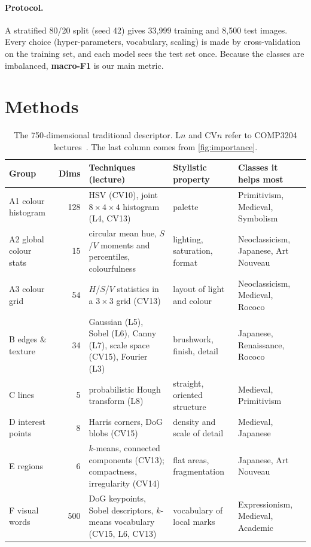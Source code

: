 \documentclass[10pt,twocolumn,a4paper]{article}
\begin{document}
\paragraph{Protocol.}
A stratified 80/20 split (seed 42) gives 33{,}999 training and 8{,}500 test images. Every choice (hyper-parameters, vocabulary, scaling) is made by cross-validation on the training set, and each model sees the test set once. Because the classes are imbalanced, \textbf{macro-F1} is our main metric.

\section{Methods}
\label{sec:methods}

\begin{table}[t]
\centering
\small
\begin{tabular}{@{}l r l l l@{}}
\toprule
Group & Dims & Techniques (lecture) & Stylistic property & Classes it helps most \\
\midrule
A1 colour histogram & 128 & HSV (CV10), joint $8{\times}4{\times}4$ histogram (L4, CV13) & palette & Primitivism, Medieval, Symbolism \\
A2 global colour stats & 15 & circular mean hue, $S$/$V$ moments and percentiles, colourfulness~\cite{hasler2003measuring} & lighting, saturation, format & Neoclassicism, Japanese, Art Nouveau \\
A3 colour grid & 54 & $H$/$S$/$V$ statistics in a $3{\times}3$ grid (CV13) & layout of light and colour & Neoclassicism, Medieval, Rococo \\
B edges \& texture & 34 & Gaussian (L5), Sobel (L6), Canny (L7), scale space (CV15), Fourier (L3) & brushwork, finish, detail & Japanese, Renaissance, Rococo \\
C lines & 5 & probabilistic Hough transform (L8) & straight, oriented structure & Medieval, Primitivism \\
D interest points & 8 & Harris corners, DoG blobs (CV15) & density and scale of detail & Medieval, Japanese \\
E regions & 6 & $k$-means, connected components (CV13); compactness, irregularity (CV14) & flat areas, fragmentation & Japanese, Art Nouveau \\
F visual words & 500 & DoG keypoints, Sobel descriptors, $k$-means vocabulary (CV15, L6, CV13) & vocabulary of local marks & Expressionism, Medieval, Academic \\
\bottomrule
\end{tabular}
\caption{The 750-dimensional traditional descriptor. L$n$ and CV$n$ refer to COMP3204 lectures~\cite{nixon2019feature}. The last column comes from \cref{fig:importance}.}
\label{tab:features}
\end{table}
\end{document}
